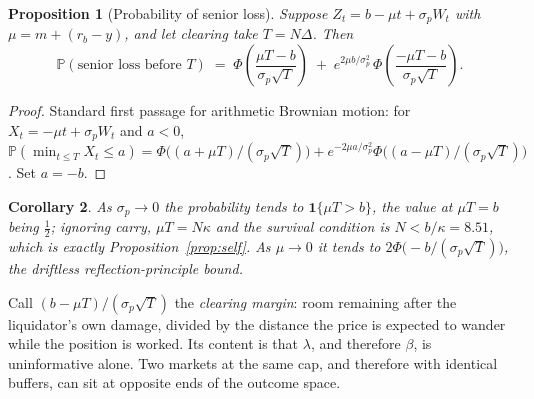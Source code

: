 \documentclass[11pt,a4paper]{article}
\theoremstyle{plain}
\newtheorem{proposition}{Proposition}
\newtheorem{corollary}[proposition]{Corollary}
\theoremstyle{definition}
\theoremstyle{remark}
\begin{document}
\begin{proposition}[Probability of senior loss]\label{prop:passage}
Suppose $Z_t = b-\mu t+\sigma_p W_t$ with $\mu = m+(r_b-y)$, and let clearing take $T=N\Delta$.
Then
\[
  \mathbb{P}(\text{senior loss before } T)
  \;=\; \Phi\!\left(\frac{\mu T-b}{\sigma_p\sqrt{T}}\right)
      \;+\; e^{2\mu b/\sigma_p^{2}}\,
        \Phi\!\left(\frac{-\mu T-b}{\sigma_p\sqrt{T}}\right).
\]
\end{proposition}

\begin{proof}
Standard first passage for arithmetic Brownian motion: for $X_t=-\mu t+\sigma_p W_t$ and $a<0$,
$\mathbb{P}(\min_{t\leq T}X_t\leq a) = \Phi\bigl((a+\mu T)/(\sigma_p\sqrt T)\bigr) +
e^{-2\mu a/\sigma_p^{2}}\Phi\bigl((a-\mu T)/(\sigma_p\sqrt T)\bigr)$. Set $a=-b$.
\end{proof}

\begin{corollary}\label{cor:limits}
As $\sigma_p\to0$ the probability tends to $\mathbf{1}\{\mu T> b\}$, the value at $\mu T=b$ being
$\tfrac12$; ignoring carry, $\mu T =
N\kappa$ and the survival condition is $N<b/\kappa=8.51$, which is exactly
Proposition~\ref{prop:self}. As $\mu\to0$ it tends to
$2\Phi\bigl(-b/(\sigma_p\sqrt T)\bigr)$, the driftless reflection-principle bound.
\end{corollary}

Call $(b-\mu T)/(\sigma_p\sqrt T)$ the \emph{clearing margin}: room remaining after the
liquidator's own damage, divided by the distance the price is expected to wander while the
position is worked. Its content is that $\lambda$, and therefore $\beta$, is uninformative alone.
Two markets at the same cap, and therefore with identical buffers, can sit at opposite ends of the
outcome space.
\end{document}
